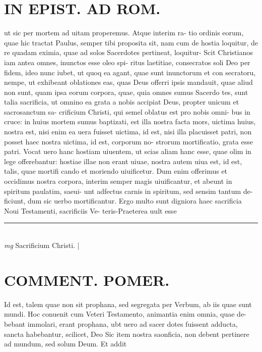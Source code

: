 \documentclass{article}
\begin{document}
\begin{pages}
\section*{IN EPIST. AD ROM.  }
\marginpar{[ p.140 ]}\pstart ut sic per mortem ad uitam properemus. Atque interim ra- tio ordinis eorum, quae hic tractat Paulus, semper tibi proposita sit, nam cum de hostia loquitur, de re quadam eximia, quae ad solos Sacerdotes pertineat, loquitur- Scit Christianos iam antea omnes, inunctos esse oleo spi- ritus laetitiae, consecratos soli Deo per fidem, ideo nunc iubet, ut quoq ea agant, quae sunt inunctorum et con secratoru, nempe, ut exhibeant oblationes eas, quas Deus offerri ipsis mandauit, quae aliud non sunt, quam ipsa eorum corpora, quae, quia omnes sumus Sacerdo tes, sunt talia sacrificia, ut omnino ea grata a nobis accipiat Deus, propter unicum et sacrosanctum sa- crificium Christi, qui semel oblatus est pro nobis omni- bus in cruce: in huius mortem sumus baptizati, est illa nostra facta mors, uictima huius, nostra est, nisi enim ea uera fuisset uictima, id est, nisi illa placuisset patri, non posset haec nostra uictima, id est, corporum no- strorum mortificatio, grata esse patri. Vocat uero hanc hostiam uiuentem, ut scias aliam hanc esse, quae olim in lege offerebantur: hostiae illae non erant uiuae, nostra autem uiua est, id est, talis, quae mortifi cando et moriendo uiuificetur. Dum enim offerimus et occidimus nostra corpora, interim semper magis uiuificantur, et abeunt in spiritum paulatim, saeui- unt adfectus carnis in spiritum, sed sensim tantum de- ficiunt, dum sic uerbo mortificantur. Ergo multo sunt digniora haec sacrificia Noui Testamenti, sacrificiis Ve- teris-Praeterea uult esse  \pend
\vspace{0.5cm}\noindent
\vspace{0.2cm}\rule{1cm}{0.2pt}\\ 
\hspace{0.2cm}\textit{mg}
\footnotesize Sacrificium Christi.  
\normalsize| 
\section*{COMMENT. POMER.  }\pstart Id est, talem quae non sit prophana, sed segregata per Verbum, ab iis quae sunt mundi. Hoc conuenit cum Veteri Testamento, animantia enim omnia, quae de- bebant immolari, erant prophana, ubt uero ad sacer dotes fuissent adducta, sancta habebantur, scilicet, Deo Sic item nostra saonficia, non debent pertinere ad mundum, sed solum Deum. Et addit  \pend
{}
{}

\end{pages}
\end{document}
